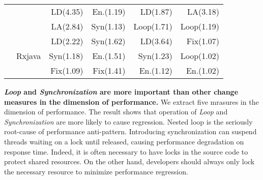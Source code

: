 \begin{table}[]
\begin{tabular}{|c|c|r|r|r|r|}
	&                         & LD(4.35)                     & En.(1.19)                & LD(1.87)                    & LA(3.18)                \\ \cline{3-6} 
	&                         & LA(2.84)                     & Syn(1.13)                & Loop(1.71)                  & Loop(1.19)              \\ \cline{2-6} 
	& \multirow{3}{*}{Rxjava} & LD(2.22)                     & Syn(1.62)                & LD(3.64)                    & Fix(1.07)               \\ \cline{3-6} 
	&                         & Syn(1.18)                    & En.(1.51)                & Syn(1.23)                   & Loop(1.02)              \\ \cline{3-6} 
	&                         & Fix(1.09)                    & Fix(1.41)                & En.(1.12)                   & En.(1.02)               \\ \hline
\end{tabular}
\end{table}

\textbf{\emph{Loop} and \emph{Synchronization} are more important than other change measures in the dimension of performance.}
We extract five mrasures in the dimension of performance. The result shows that operation of \emph{Loop} and \emph{Synchronization} are more likely to cause regression. Nested loop is the seriously root-cause of performance anti-pattern. Introducing synchronization can suspend threads waiting on a lock until released, causing performance degradation on response time. Indeed, it is often necessary to have locks in the source code to protect shared resources. On the other hand, developers should always only lock the necessary resource to minimize performance regression. 





